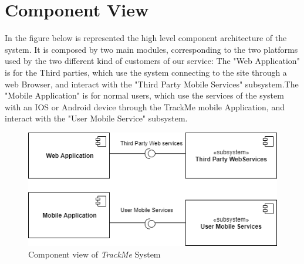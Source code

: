 \section{Component View}
In the figure below is represented the high level component architecture of the system. It is composed by two main modules, corresponding to the two platforms used by the two different kind of customers of our service: 
The "Web Application" is for the Third parties, which  use the system connecting to the site through a web Browser, and interact with the "Third Party Mobile Services" subsystem.The "Mobile Application" is for normal users, which use the services of the system with an IOS or Android device through the TrackMe mobile Application, and interact with the "User Mobile Service" subsystem.
\newline
\newline
\newline

\begin{figure}[H]
    \centering
    \includegraphics[scale=0.4]{DD/Pictures/component.png}
    \caption{Component view of \emph{TrackMe} System}
\end{figure}

